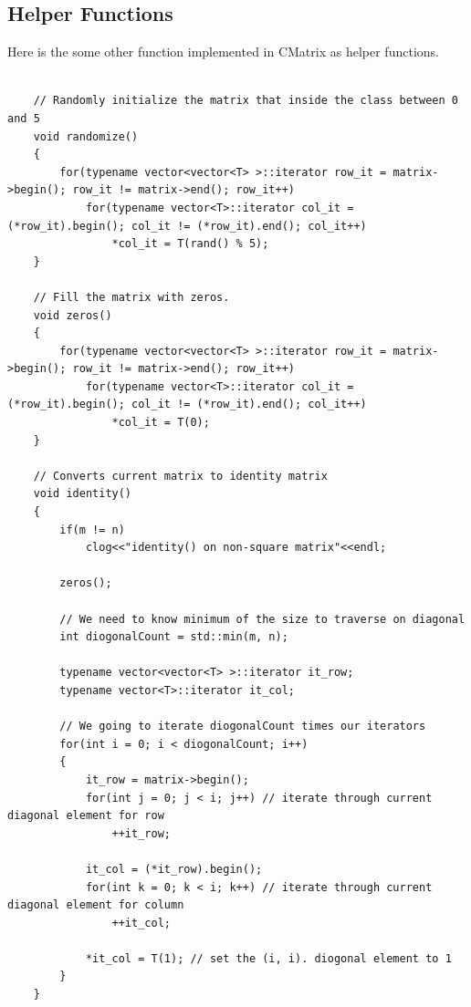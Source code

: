 \documentclass{article}
\begin{document}
	\subsection{Helper Functions}
	Here is the some other function implemented in CMatrix as helper functions.
	\begin{lstlisting}[label=CMatrixHelper, caption=CMatrix Helper Functions]
	
    // Randomly initialize the matrix that inside the class between 0 and 5
    void randomize()
    {
        for(typename vector<vector<T> >::iterator row_it = matrix->begin(); row_it != matrix->end(); row_it++)
            for(typename vector<T>::iterator col_it = (*row_it).begin(); col_it != (*row_it).end(); col_it++)
                *col_it = T(rand() % 5);
    }
    
    // Fill the matrix with zeros.
    void zeros()
    {
        for(typename vector<vector<T> >::iterator row_it = matrix->begin(); row_it != matrix->end(); row_it++)
            for(typename vector<T>::iterator col_it = (*row_it).begin(); col_it != (*row_it).end(); col_it++)
                *col_it = T(0);
    }
    
    // Converts current matrix to identity matrix
    void identity()
    {
        if(m != n)
            clog<<"identity() on non-square matrix"<<endl;

        zeros();

        // We need to know minimum of the size to traverse on diagonal
        int diogonalCount = std::min(m, n);

        typename vector<vector<T> >::iterator it_row;
        typename vector<T>::iterator it_col;

        // We going to iterate diogonalCount times our iterators
        for(int i = 0; i < diogonalCount; i++)
        {
            it_row = matrix->begin();
            for(int j = 0; j < i; j++) // iterate through current diagonal element for row
                ++it_row;

            it_col = (*it_row).begin();
            for(int k = 0; k < i; k++) // iterate through current diagonal element for column
                ++it_col;

            *it_col = T(1); // set the (i, i). diogonal element to 1
        }
    }
    
    
	\end{lstlisting}
	
	
\end{document}
